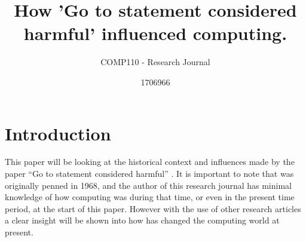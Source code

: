 \documentclass{scrartcl}
\title{How 'Go to statement considered harmful' influenced computing.}
\subtitle{COMP110 - Research Journal}
\author{1706966}
\begin{document}
\maketitle

\section{Introduction}

This paper will be looking at the historical context and influences made by the paper “Go to statement considered harmful” \cite{dijkstra2002go}. It is important to note that \cite{dijkstra2002go} was originally penned in 1968, and the author of this research journal has minimal knowledge of how computing was during that time, or even in the present time period, at the start of this paper. However with the use of other research articles a clear insight will be shown into how \cite{dijkstra2002go} has changed the computing world at present. 
\end{document}
